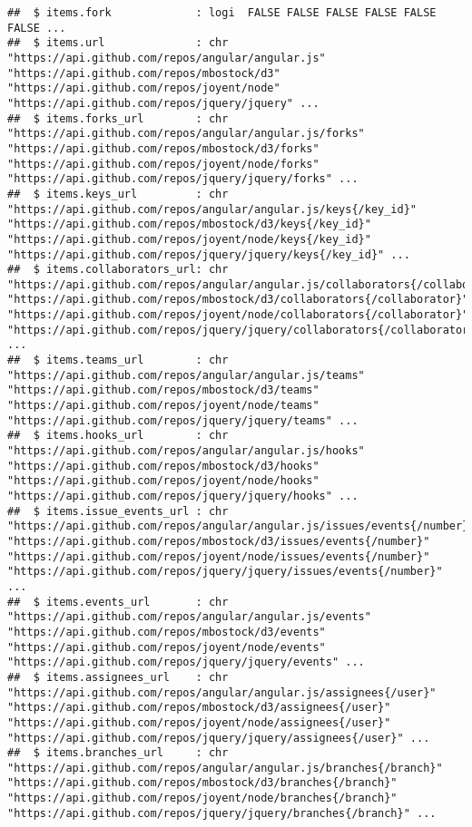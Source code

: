 \documentclass{article}\usepackage[]{graphicx}\usepackage[]{color}
\makeatletter
\newenvironment{kframe}{%
 \def\at@end@of@kframe{}%
 \ifinner\ifhmode%
  \def\at@end@of@kframe{\end{minipage}}%
  \begin{minipage}{\columnwidth}%
 \fi\fi%
 \def\FrameCommand##1{\hskip\@totalleftmargin \hskip-\fboxsep
 \colorbox{shadecolor}{##1}\hskip-\fboxsep
     \hskip-\linewidth \hskip-\@totalleftmargin \hskip\columnwidth}%
 \MakeFramed {\advance\hsize-\width
   \@totalleftmargin\z@ \linewidth\hsize
   \@setminipage}}%
 {\par\unskip\endMakeFramed%
 \at@end@of@kframe}
\newenvironment{knitrout}{}{} %
\makeatother
\begin{document}
\begin{knitrout}
\begin{kframe}
\begin{verbatim}
##  $ items.fork             : logi  FALSE FALSE FALSE FALSE FALSE FALSE ...
##  $ items.url              : chr  "https://api.github.com/repos/angular/angular.js" "https://api.github.com/repos/mbostock/d3" "https://api.github.com/repos/joyent/node" "https://api.github.com/repos/jquery/jquery" ...
##  $ items.forks_url        : chr  "https://api.github.com/repos/angular/angular.js/forks" "https://api.github.com/repos/mbostock/d3/forks" "https://api.github.com/repos/joyent/node/forks" "https://api.github.com/repos/jquery/jquery/forks" ...
##  $ items.keys_url         : chr  "https://api.github.com/repos/angular/angular.js/keys{/key_id}" "https://api.github.com/repos/mbostock/d3/keys{/key_id}" "https://api.github.com/repos/joyent/node/keys{/key_id}" "https://api.github.com/repos/jquery/jquery/keys{/key_id}" ...
##  $ items.collaborators_url: chr  "https://api.github.com/repos/angular/angular.js/collaborators{/collaborator}" "https://api.github.com/repos/mbostock/d3/collaborators{/collaborator}" "https://api.github.com/repos/joyent/node/collaborators{/collaborator}" "https://api.github.com/repos/jquery/jquery/collaborators{/collaborator}" ...
##  $ items.teams_url        : chr  "https://api.github.com/repos/angular/angular.js/teams" "https://api.github.com/repos/mbostock/d3/teams" "https://api.github.com/repos/joyent/node/teams" "https://api.github.com/repos/jquery/jquery/teams" ...
##  $ items.hooks_url        : chr  "https://api.github.com/repos/angular/angular.js/hooks" "https://api.github.com/repos/mbostock/d3/hooks" "https://api.github.com/repos/joyent/node/hooks" "https://api.github.com/repos/jquery/jquery/hooks" ...
##  $ items.issue_events_url : chr  "https://api.github.com/repos/angular/angular.js/issues/events{/number}" "https://api.github.com/repos/mbostock/d3/issues/events{/number}" "https://api.github.com/repos/joyent/node/issues/events{/number}" "https://api.github.com/repos/jquery/jquery/issues/events{/number}" ...
##  $ items.events_url       : chr  "https://api.github.com/repos/angular/angular.js/events" "https://api.github.com/repos/mbostock/d3/events" "https://api.github.com/repos/joyent/node/events" "https://api.github.com/repos/jquery/jquery/events" ...
##  $ items.assignees_url    : chr  "https://api.github.com/repos/angular/angular.js/assignees{/user}" "https://api.github.com/repos/mbostock/d3/assignees{/user}" "https://api.github.com/repos/joyent/node/assignees{/user}" "https://api.github.com/repos/jquery/jquery/assignees{/user}" ...
##  $ items.branches_url     : chr  "https://api.github.com/repos/angular/angular.js/branches{/branch}" "https://api.github.com/repos/mbostock/d3/branches{/branch}" "https://api.github.com/repos/joyent/node/branches{/branch}" "https://api.github.com/repos/jquery/jquery/branches{/branch}" ...

\end{verbatim}
\end{kframe}
\end{knitrout}
\end{document}
